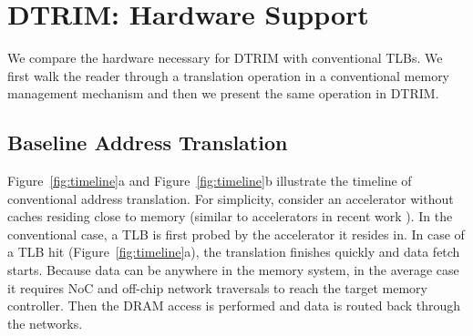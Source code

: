 \section{DTRIM: Hardware Support}
\label{sec:hw_support}

%


We compare the hardware necessary for DTRIM with conventional
TLBs. We first walk the reader through a translation operation in a
conventional memory management mechanism and then we present the same
operation in DTRIM.

\subsection{Baseline Address Translation}

Figure~\ref{fig:timeline}a and Figure~\ref{fig:timeline}b illustrate
the timeline of conventional address translation. For simplicity,
consider an accelerator without caches residing close to memory
(similar to accelerators in recent work \cite{haria:devirtualizing,
  picorel:near-memory}). In the conventional case, a TLB is first
probed by the accelerator it resides in. In case of a TLB hit
(Figure~\ref{fig:timeline}a), the translation finishes quickly and
data fetch starts. Because data can be anywhere in the memory system,
in the average case it requires NoC and off-chip network traversals to
reach the target memory controller. Then the DRAM access is performed
and data is routed back through the networks.


